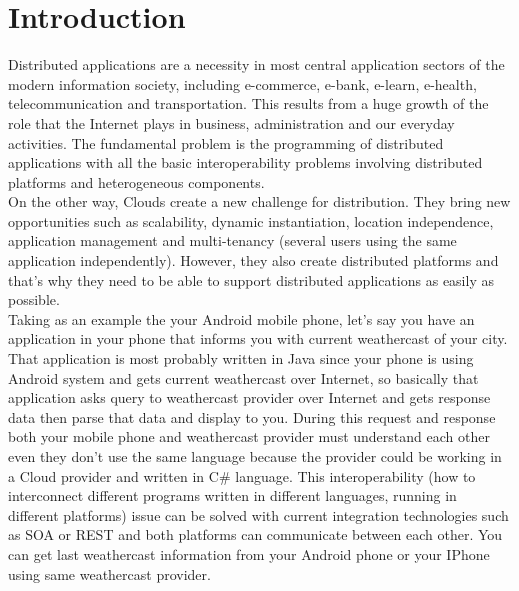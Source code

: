 
\chapter{Introduction}
\label{chapter:introduction}

Distributed applications are a necessity in most central application sectors of the modern information society,
including e-commerce, e-bank, e-learn, e-health, telecommunication and transportation. This results from a huge
growth of the role that the Internet plays in business, administration and our everyday activities.
The fundamental problem is the programming of distributed applications with all the basic interoperability problems
involving distributed platforms and heterogeneous components.\\

On the other way, Clouds create a new challenge for distribution. They bring new opportunities such as scalability,
dynamic instantiation, location independence, application management and multi-tenancy (several users using the same
application independently). However, they also create distributed platforms and that’s why they need to be able to
support distributed applications as easily as possible.\\

Taking as an example the your Android mobile phone, let's say you have an application in your phone that informs you with current
weathercast of your city. That application is most probably written in Java since your phone is using Android system and gets
current weathercast over Internet, so basically that application asks query to weathercast provider over Internet and gets
response data then parse that data and display to you. During this request and response both your mobile phone and weathercast
provider must understand each other even they don’t use the same language because the provider could be working in a Cloud
provider and written in C\# language. This interoperability (how to interconnect different programs written in different
languages, running in different platforms) issue can be solved with current integration technologies such as SOA or REST and both
platforms can communicate between each other. You can get last weathercast information from your Android phone or your IPhone
using same weathercast provider.\\

